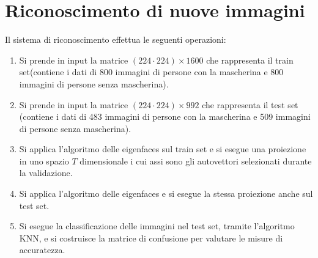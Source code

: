 \documentclass[12pt]{article}
\begin{document}
\section{Riconoscimento di nuove immagini}
Il sistema di riconoscimento effettua le seguenti operazioni:
\begin{enumerate}
    \item Si prende in input la matrice $(224 \cdot 224) \times 1600$ che rappresenta il train set\footnotemark[1] (contiene i dati di 800 immagini di persone con la mascherina e 800 immagini di persone senza mascherina).
    \item Si prende in input la matrice $(224 \cdot 224) \times 992$ che rappresenta il test set (contiene i dati di 483 immagini di persone con la mascherina e 509 immagini di persone senza mascherina).
    \item Si applica l'algoritmo delle eigenfaces sul train set e si esegue una proiezione in uno spazio $T$ dimensionale i cui assi sono gli autovettori selezionati durante la validazione.
    \item Si applica l'algoritmo delle eigenfaces e si esegue la stessa proiezione anche sul test set.
    \item Si esegue la classificazione delle immagini nel test set, tramite l'algoritmo KNN, e si costruisce la matrice di confusione per valutare le misure di accuratezza.
\end{enumerate}

\end{document}
